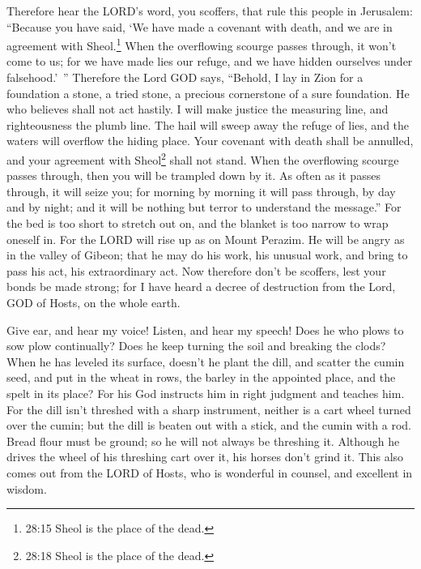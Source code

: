 \myverse{}Therefore hear the LORD’s word, you scoffers, that rule this
people in Jerusalem:
\myverse{}“Because you have said, ‘We have made a covenant with death, and we are in
agreement with Sheol.\footnote{28:15 Sheol is the place of the dead.} When the overflowing scourge passes through, it won’t
come to us; for we have made lies our refuge, and we have hidden ourselves under falsehood.’ ”
\myverse{}Therefore the Lord GOD says, “Behold, I lay in Zion for a foundation a stone,
a tried stone, a precious cornerstone of a sure foundation. He who believes shall not act hastily.
\myverse{}I will make justice the measuring line, and righteousness the plumb line.
The hail will sweep away the refuge of lies, and the waters will overflow the hiding place.
\myverse{}Your covenant with death shall be annulled, and your agreement with Sheol\footnote{28:18 Sheol is the place of the dead.} shall not stand. When the overflowing scourge passes
through, then you will be trampled down by it.
\myverse{}As often as it passes through, it will seize you; for morning by morning
it will pass through, by day and by night; and it will be nothing but terror to understand the message.”
\myverse{}For the bed is too short to stretch out on, and the blanket is too narrow
to wrap oneself in.
\myverse{}For the LORD will rise up as on Mount Perazim. He will be angry as in the
valley of Gibeon; that he may do his work, his unusual work, and bring to pass his act, his extraordinary
act.
\myverse{}Now therefore don’t be scoffers, lest your bonds be made strong; for I have
heard a decree of destruction from the Lord, GOD of Hosts, on the whole earth.

\myverse{}Give ear, and hear my voice! Listen, and hear my speech!
\myverse{}Does he who plows to sow plow continually? Does he keep turning the soil
and breaking the clods?
\myverse{}When he has leveled its surface, doesn’t he plant the dill, and scatter the
cumin seed, and put in the wheat in rows, the barley in the appointed place, and the spelt in its place?
\myverse{}For his God instructs him in right judgment and teaches him.
\myverse{}For the dill isn’t threshed with a sharp instrument, neither is a cart wheel
turned over the cumin; but the dill is beaten out with a stick, and the cumin with a rod.
\myverse{}Bread flour must be ground; so he will not always be threshing it. Although
he drives the wheel of his threshing cart over it, his horses don’t grind it.
\myverse{}This also comes out from the LORD of Hosts, who is wonderful in counsel,
and excellent in wisdom.


